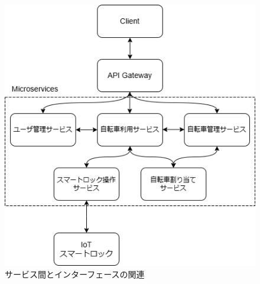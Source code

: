           \begin{figure}[htbp]
            \centering
            \includegraphics[scale=0.49]
            {figures/microservice-architecture.png}
            \caption{サービス間とインターフェースの関連}
            \label{fig:サービス間とインターフェースの関連}
          \end{figure}

